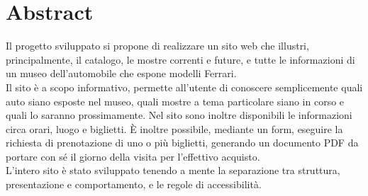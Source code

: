 \section{Abstract}
Il progetto sviluppato si propone di realizzare un sito web che illustri, principalmente, il catalogo, le mostre correnti e future, e tutte le informazioni di un museo dell'automobile che espone modelli Ferrari.\\
Il sito è a scopo informativo, permette all'utente di conoscere semplicemente quali auto siano esposte nel museo, quali mostre a tema particolare siano in corso e quali lo saranno prossimamente. Nel sito sono inoltre disponibili le informazioni circa orari, luogo e biglietti. È inoltre possibile, mediante un form, eseguire la richiesta di prenotazione di uno o più biglietti, generando un documento PDF da portare con sé il giorno della visita per l'effettivo acquisto.\\
L'intero sito è stato sviluppato tenendo a mente la separazione tra struttura, presentazione e comportamento, e le regole di accessibilità.
